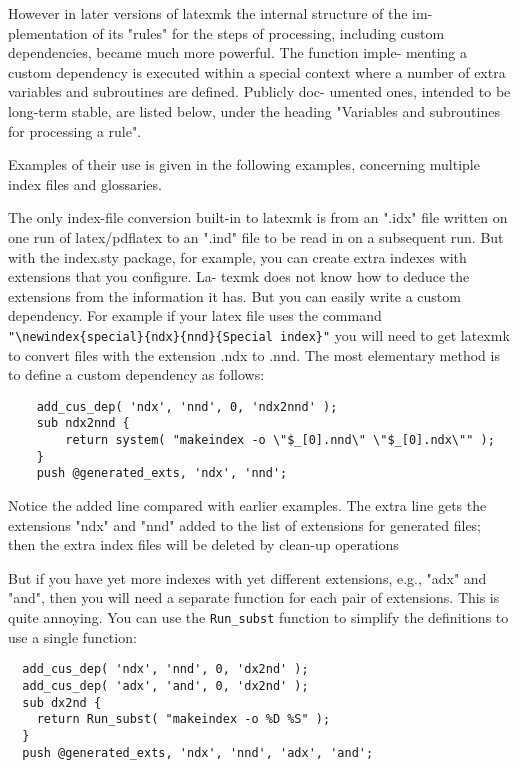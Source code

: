However  in later versions of latexmk the internal structure of the im-
plementation of its "rules" for  the  steps  of  processing,  including
custom  dependencies,  became  much more powerful.  The function imple-
menting a custom dependency is executed within a special context  where
a number of extra variables and subroutines are defined.  Publicly doc-
umented ones, intended to be long-term stable, are listed below,  under
the heading "Variables and subroutines for processing a rule".

Examples  of  their  use is given in the following examples, concerning
multiple index files and glossaries.

The only index-file conversion built-in to latexmk is  from  an  ".idx" file
written on one run of latex/pdflatex to an ".ind" file to be read in on a
subsequent run.  But with the index.sty package,  for  example, you  can
create extra indexes with extensions that you configure.  La- texmk does not
know how to deduce the extensions from  the  information it  has.  But you can
easily write a custom dependency.  For example if your latex file uses the
command  \verb|"\newindex{special}{ndx}{nnd}{Special index}"|  you  will need to get
latexmk to convert files with the extension .ndx to .nnd.  The most
elementary method is to  define  a  custom dependency as follows:

\begin{verbatim}
	add_cus_dep( 'ndx', 'nnd', 0, 'ndx2nnd' );
	sub ndx2nnd {
		return system( "makeindex -o \"$_[0].nnd\" \"$_[0].ndx\"" );
	}
	push @generated_exts, 'ndx', 'nnd';
\end{verbatim}

Notice  the  added line compared with earlier examples.  The extra line
gets the extensions "ndx" and "nnd" added to the list of extensions for
generated files; then the extra index files will be deleted by clean-up
operations

But if you have yet more indexes with yet different  extensions,  e.g.,
"adx"  and  "and", then you will need a separate function for each pair
of extensions.  This is quite annoying.   You  can  use  the  \verb|Run_subst|
function to simplify the definitions to use a single function:

\begin{verbatim}
  add_cus_dep( 'ndx', 'nnd', 0, 'dx2nd' );
  add_cus_dep( 'adx', 'and', 0, 'dx2nd' );
  sub dx2nd {
    return Run_subst( "makeindex -o %D %S" );
  }
  push @generated_exts, 'ndx', 'nnd', 'adx', 'and';
\end{verbatim}

